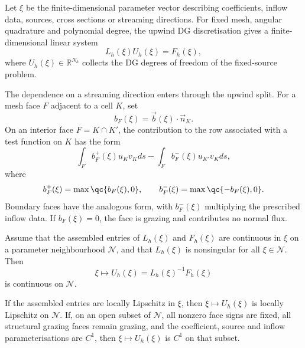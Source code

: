 \documentclass[final]{amsart}
\begin{document}
Let $\xi$ be the finite-dimensional parameter vector describing
coefficients, inflow data, sources, cross sections or streaming
directions. For fixed mesh, angular quadrature and polynomial degree,
the upwind DG discretisation gives a finite-dimensional linear system
\begin{equation}
  L_h(\xi)U_h(\xi)=F_h(\xi),
  \label{eq:uq_discrete_system}
\end{equation}
where $U_h(\xi)\in\mathbb{R}^{N_h}$ collects the DG degrees of freedom
of the fixed-source problem.

The dependence on a streaming direction enters through the upwind split.
For a mesh face $F$ adjacent to a cell $K$, set
\begin{equation}
  b_F(\xi)=\vec b(\xi)\cdot\vec n_K .
\end{equation}
On an interior face $F=K\cap K'$, the contribution to the row associated
with a test function on $K$ has the form
\begin{equation}
  \int_F b_F^+(\xi) u_K v_K ds
  -
  \int_F b_F^-(\xi) u_{K'} v_K ds,
  \label{eq:uq_upwind_split_face}
\end{equation}
where
\begin{equation}
  b_F^+(\xi)=\max\qc{b_F(\xi),0},
  \qquad
  b_F^-(\xi)=\max\qc{-b_F(\xi),0}.
  \label{eq:uq_positive_negative_parts}
\end{equation}
Boundary faces have the analogous form, with $b_F^-(\xi)$ multiplying
the prescribed inflow data. If $b_F(\xi)=0$, the face is grazing and
contributes no normal flux.

\begin{proposition}
\label{prop:uq_continuity_branchwise}
Assume that the assembled entries of $L_h(\xi)$ and $F_h(\xi)$ are
continuous in $\xi$ on a parameter neighbourhood $\mathcal{N}$, and
that $L_h(\xi)$ is nonsingular for all $\xi\in\mathcal{N}$. Then
\begin{equation}
  \xi\mapsto U_h(\xi)=L_h(\xi)^{-1}F_h(\xi)
\end{equation}
is continuous on $\mathcal{N}$.

If the assembled entries are locally Lipschitz in $\xi$, then
$\xi\mapsto U_h(\xi)$ is locally Lipschitz on $\mathcal{N}$. If, on an
open subset of $\mathcal{N}$, all nonzero face signs are fixed, all
structural grazing faces remain grazing, and the coefficient, source
and inflow parameterisations are $C^1$, then $\xi\mapsto U_h(\xi)$ is
$C^1$ on that subset.
\end{proposition}
\end{document}
